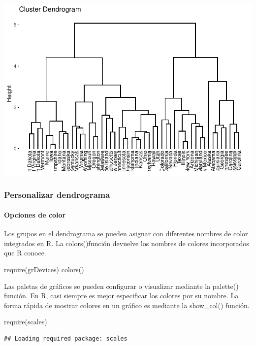 \documentclass[
]{article}
\newenvironment{Shaded}{\begin{snugshade}}{\end{snugshade}}
\newcommand{\FunctionTok}[1]{\textcolor[rgb]{0.00,0.00,0.00}{#1}}
\newcommand{\NormalTok}[1]{#1}
\begin{document}
\includegraphics{clusterjerarquico1_files/figure-latex/unnamed-chunk-7-1.pdf}

\hypertarget{personalizar-dendrograma}{%
\subsubsection{Personalizar
dendrograma}\label{personalizar-dendrograma}}

\hypertarget{opciones-de-color}{%
\paragraph{Opciones de color}\label{opciones-de-color}}

Los grupos en el dendrograma se pueden asignar con diferentes nombres de
color integrados en R. La colors()función devuelve los nombres de
colores incorporados que R conoce.

require(grDevices) colors()

Las paletas de gráficos se pueden configurar o visualizar mediante la
palette() función. En R, casi siempre es mejor especificar los colores
por su nombre. La forma rápida de mostrar colores en un gráfico es
mediante la show\_col() función.

\begin{Shaded}
\begin{Highlighting}[]
\FunctionTok{require}\NormalTok{(scales)}
\end{Highlighting}
\end{Shaded}

\begin{verbatim}
## Loading required package: scales
\end{verbatim}
\end{document}
